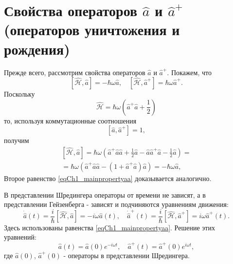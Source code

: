 \section{Свойства операторов $ \hat a $ и $ \hat a ^+ $ (операторов
  уничтожения и рождения)} 
Прежде всего, рассмотрим свойства операторов $\hat{a}$  и
$\hat{a}^{+}$.  Покажем, что 
\begin{equation}
\left[\hat{\mathcal{H}}, \hat{a}\right] = 
- \hbar \omega \hat{a}, \quad
\left[\hat{\mathcal{H}}, \hat{a}^{+}\right] = 
\hbar \omega \hat{a}^{+}.
\label{eqCh1_mainpropertyaa}
\end{equation}
Поскольку  
\[
\hat{\mathcal{H}} =  
\hbar \omega \left(\hat{a}^{+} \hat{a} +
\frac{1}{2}\right)
\]
то, используя коммутационные соотношения
\[
\left[\hat{a}, \hat{a}^{+}\right] = 1,
\]  
получим
\begin{eqnarray}
\left[\hat{\mathcal{H}}, \hat{a}\right] = 
\hbar \omega \left( 
\hat{a}^{+}\hat{a}\hat{a} + \frac{1}{2} \hat{a} -
\hat{a}\hat{a}^{+}\hat{a} - \frac{1}{2}\hat{a} 
\right)
= 
\nonumber \\ 
= \hbar \omega\left(
\hat{a}^{+}\hat{a}\hat{a} - \left(1 + \hat{a}^{+}\hat{a}\right)\hat{a} 
\right) = - \hbar \omega \hat{a} 
,
\nonumber
\end{eqnarray}
Второе равенство \eqref{eqCh1_mainpropertyaa} доказывается
аналогично. 

В представлении Шредингера операторы от времени не зависят, а в
представлении Гейзенберга - зависят и подчиняются уравнениям движения: 
\begin{equation}
\dot{\hat{a}}\left(t\right) = \frac{i}{\hbar}\left[\hat{\mathcal{H}},
  \hat{a}\right] = -i \omega \hat{a}\left(t\right), \quad
\dot{\hat{a}}^{+}\left(t\right) = \frac{i}{\hbar}\left[\hat{\mathcal{H}},
  \hat{a}^{+}\right] = i \omega \hat{a}^{+}\left(t\right).
\label{eqCh1_54}
\end{equation}
Здесь использованы равенства \eqref{eqCh1_mainpropertyaa}. Решение
этих уравнений: 
\begin{equation}
\hat{a}\left(t\right) = \hat{a}\left(0\right) e^{- i \omega t}, \quad
\hat{a}^{+}\left(t\right) = \hat{a}^{+}\left(0\right) e^{i \omega t}, 
\end{equation}
где  $\hat{a}\left(0\right)$, $\hat{a}^{+}\left(0\right)$ - операторы
в представлении Шредингера.
